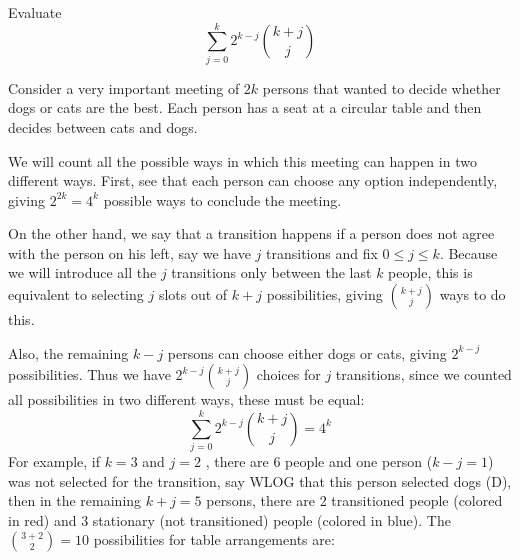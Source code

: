\begin{problem}[C][7][Putnam 2020 A2]
    Evaluate
    $$\sum_{j=0}^k 2^{k-j} \binom{k+j}{j}$$
\end{problem}

\begin{solution}[$4^k$]
    Consider a very important meeting of $2k$ persons that wanted to decide whether dogs or cats are the best. Each person has a seat at a circular table and then decides between cats and dogs.
    
    We will count all the possible ways in which this meeting can happen in two different ways. First, see that each person can choose any option independently, giving $2^{2k}=4^k$ possible ways to conclude the meeting.

    On the other hand, we say that a transition happens if a person does not agree with the person on his left, say we have $j$ transitions and fix $0\leq j \leq k$. Because we will introduce all the $j$ transitions only between the last $k$ people, this is equivalent to selecting $j$ slots out of $k+j$ possibilities, giving $\binom{k+j}{j}$ ways to do this. 
    
    Also, the remaining $k-j$ persons can choose either dogs or cats, giving $2^{k-j}$ possibilities. Thus we have $2^{k-j}\binom{k+j}{j}$ choices for $j$ transitions, since we counted all possibilities in two different ways, these must be equal: 
    $$\sum_{j=0}^k 2^{k-j} \binom{k+j}{j}=4^k $$
    For example, if $k=3$ and $j=2$ , there are 6 people and one person ($k-j=1$) was not selected for the transition, say WLOG that this person selected dogs (D), then in the remaining $k+j=5$ persons, there are 2 transitioned people (colored in red) and 3 stationary (not transitioned) people (colored in blue). The $\binom{3+2}{2}=10$ possibilities for table arrangements are:
    
\end{solution}

